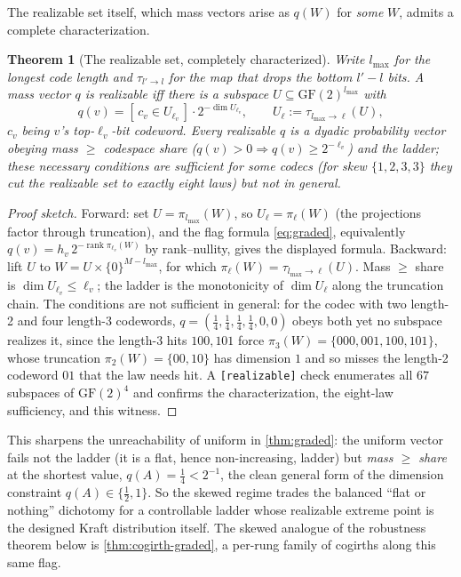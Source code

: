 \documentclass[11pt]{article}
\theoremstyle{definition}
\theoremstyle{plain}
\newtheorem{theorem}{Theorem}[section]
\theoremstyle{remark}
\newcommand{\GF}{\mathrm{GF}(2)}
\DeclareMathOperator{\rank}{rank}
\newcommand{\W}{W}                          %
\newcommand{\proj}{\pi}                     %
\begin{document}
The realizable set itself, which mass vectors arise as $q(\W)$ for \emph{some} $\W$, admits
a complete characterization.

\begin{theorem}[The realizable set, completely characterized]
\label{thm:realizable}
Write $l_{\max}$ for the longest code length and $\tau_{l' \to l}$ for the map that drops the
bottom $l' - l$ bits. A mass vector $q$ is realizable iff there is a subspace $U \subseteq
\GF^{l_{\max}}$ with
\[
  q(v) = [\, c_v \in U_{\ell_v} \,] \cdot 2^{-\dim U_{\ell_v}},
  \qquad U_\ell := \tau_{l_{\max} \to \ell}(U),
\]
$c_v$ being $v$'s top-$\ell_v$-bit codeword. Every realizable $q$ is a dyadic probability
vector obeying \emph{mass $\ge$ codespace share} ($q(v) > 0 \Rightarrow q(v) \ge 2^{-\ell_v}$)
and the ladder; these necessary conditions are \emph{sufficient} for some codecs (for skew
$\{1,2,3,3\}$ they cut the realizable set to exactly eight laws) but not in general.
\end{theorem}

\begin{proof}[Proof sketch]
Forward: set $U = \proj_{l_{\max}}(\W)$, so $U_\ell = \proj_\ell(\W)$ (the projections factor
through truncation), and the flag formula \eqref{eq:graded}, equivalently $q(v) = h_v\,
2^{-\rank \proj_{\ell_v}(\W)}$ by rank--nullity, gives the displayed formula.
Backward: lift $U$ to $\W = U \times \{0\}^{M - l_{\max}}$, for which $\proj_\ell(\W) =
\tau_{l_{\max} \to \ell}(U)$. Mass $\ge$ share is $\dim U_{\ell_v} \le \ell_v$; the ladder is
the monotonicity of $\dim U_\ell$ along the truncation chain. The conditions are not sufficient
in general: for the codec with two length-2 and four length-3 codewords,
$q = (\tfrac14,\tfrac14,\tfrac14,\tfrac14,0,0)$ obeys both yet no subspace realizes it, since the
length-3 hits $100, 101$ force $\proj_3(\W) = \{000,001,100,101\}$, whose truncation
$\proj_2(\W) = \{00,10\}$ has dimension $1$ and so misses the length-2 codeword $01$ that the law
needs hit. A \texttt{[realizable]} check enumerates all $67$ subspaces of $\GF^4$ and confirms the
characterization, the eight-law sufficiency, and this witness.
\end{proof}

This sharpens the unreachability of uniform in \cref{thm:graded}: the uniform vector fails not the
ladder (it is a flat, hence non-increasing, ladder) but \emph{mass $\ge$ share} at the shortest
value, $q(A) = \tfrac14 < 2^{-1}$, the clean general form of the dimension constraint $q(A) \in
\{\tfrac12, 1\}$. So the skewed regime trades the balanced ``flat or nothing'' dichotomy for a
controllable ladder whose realizable extreme point is the designed Kraft distribution itself. The
skewed analogue of the robustness theorem below is \cref{thm:cogirth-graded}, a per-rung family of
cogirths along this same flag.
\end{document}
